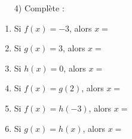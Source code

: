 {    \begin{enumerate}
       \item[4)] Complète :
\end{enumerate}
	\begin{multicols}{2}
		\begin{enumerate}[label=\roman*)]
		\item Si $f(x)=-3$, alors $x=$
		\item Si $g(x)=3$, alors $x=$
		\item Si $h(x)=0$, alors $x=$
		\item Si $f(x)=g(2)$, alors $x=$
		\item Si $f(x)=h(-3)$, alors $x=$
		\item Si $g(x)=h(x)$, alors $x=$
\end{enumerate}
\end{multicols}

}
\correction{

}

